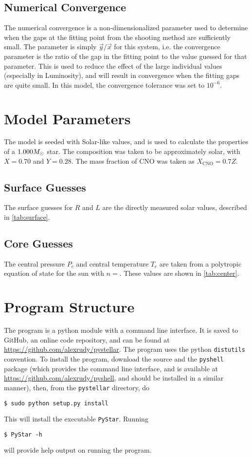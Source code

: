 \documentclass[10pt]{article}
\newcommand{\txt}{\textrm} %
\renewcommand{\v}[1]{\vec{#1}} %
\begin{document}
\subsection{Numerical Convergence} \label{sec:convergence}
The numerical convergence is a non-dimensionalized parameter used to determine when the gaps at the fitting point from the shooting method are sufficiently small. The parameter is simply $\v{y} / \v{x}$ for this system, i.e. the convergence parameter is the ratio of the gap in the fitting point to the value guessed for that parameter. This is used to reduce the effect of the large individual values (especially in Luminosity), and will result in convergence when the fitting gaps are quite small. In this model, the convergence tolerance was set to $10^{-6}$.
\section{Model Parameters}\label{sec:parameters}
The model is seeded with Solar-like values, and is used to calculate the properties of a $1.000 M_\odot$ star. The composition was taken to be approximately solar, with $X=0.70$ and $Y=0.28$. The mass fraction of CNO was taken as $X_\txt{CNO} = 0.7 Z$.

\subsection{Surface Guesses}
The surface guesses for $R$ and $L$ are the directly measured solar values, described in \cref{tab:surface}.

\subsection{Core Guesses}
The central pressure $P_c$ and central temperature $T_c$ are taken from a polytropic equation of state for the sun with $n=$. These values are shown in \cref{tab:center}.

\section{Program Structure} \label{sec:structure}
The program is a python module with a command line interface. It is saved to GitHub, an online code repository, and can be found at \url{https://github.com/alexrudy/pystellar}. The program uses the python \lstinline{distutils} convention. To install the program, download the source and the \lstinline{pyshell} package (which provides the command line interface, and is available at \url{https://github.com/alexrudy/pyshell}, and should be installed in a similar manner), then, from the \lstinline{pystellar} directory, do
\begin{verbatim}
$ sudo python setup.py install
\end{verbatim}
This will install the executable \lstinline{PyStar}. Running
\begin{verbatim}
$ PyStar -h
\end{verbatim}
will provide help output on running the program.
\end{document}
